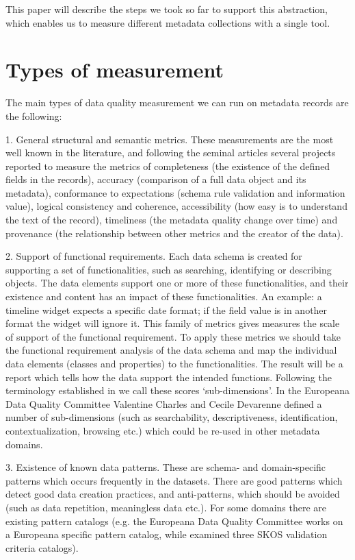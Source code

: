 This paper will describe the steps we took so far to support this abstraction, which enables us to measure different metadata collections with a single tool.

\section{Types of measurement}

The main types of data quality measurement we can run on metadata records are the following:

1. General structural and semantic metrics. These measurements are the most well known in the literature, and following the seminal articles \cite{bruce-hillmann2004, ochoa-duval2009} several projects reported to measure
the metrics of completeness (the existence of the defined fields in the records), accuracy (comparison of a full data object and its metadata), conformance to expectations (schema rule validation and information value), logical consistency and coherence, accessibility (how easy is to understand the text of the record), timeliness (the metadata quality change over time) and provenance (the relationship between other metrics and the creator of the data).

2. Support of functional requirements. Each data schema is created for supporting a set of functionalities, such as searching, identifying or describing objects. The data elements support one or more of these functionalities, and their existence and content has an impact of these functionalities. An example: a timeline widget expects a specific date format; if the field value is in another format the widget will ignore it. This family of metrics gives measures the scale of support of the functional requirement. To apply these metrics we should take the functional requirement analysis of the data schema and map the individual data elements (classes and properties) to the functionalities. The result will be a report which tells how the data support the intended functions. Following the terminology established in \cite{gavrilis2015} we call these scores `sub-dimensions'. In the Europeana Data Quality Committee Valentine Charles and Cecile Devarenne defined a number of sub-dimensions (such as searchability, descriptiveness, identification, contextualization, browsing etc.) which could be re-used in other metadata domains.

3. Existence of known data patterns. These are schema- and domain-specific patterns which occurs frequently in the datasets. There are good patterns which detect good data creation practices, and anti-patterns, which should be avoided (such as data repetition, meaningless data etc.). For some domains there are existing pattern catalogs (e.g. the Europeana Data Quality Committee works on a Europeana specific pattern catalog, while \cite{suominen2012} examined three SKOS validation criteria catalogs).


